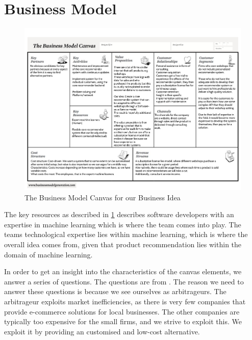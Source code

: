 \section{Business Model}
\begin{figure}
	\centering
	\includegraphics[width = 1.5\textwidth, angle=90]{figures/business-model-canvas}
	\caption{The Business Model Canvas for our Business Idea}
	\label{fig:BusinessModelCanvas}
\end{figure}

The key resources as described in \cref{fig:BusinessModelCanvas} describes software developers with an expertise in machine learning which is where the team comes into play.
The teams technological expertise lies within machine learning, which is where the overall idea comes from, given that product recommendation lies within the domain of machine learning.

In order to get an insight into the characteristics of the canvas elements, we answer a series of questions. 
The questions are from \citep[pg. 40-55]{book:jrose}.
The reason we need to answer these questions is because we see ourselves as arbitrageurs.
The arbitrageur exploits market inefficiencies, as there is very few companies that provide e-commerce solutions for local businesses. 
The other companies are typically too expensive for the small firms, and we strive to exploit this.
We exploit it by providing an customised and low-cost alternative.

